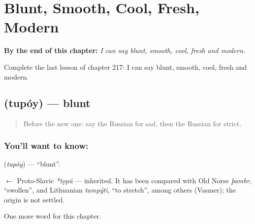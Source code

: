 
\chapter{Blunt, Smooth, Cool, Fresh, Modern}
\label{ch:ru-blunt-smooth-cool-fresh-modern}

\begin{chapteropening}
\textbf{By the end of this chapter:} \emph{I can say blunt, smooth, cool, fresh and modern.}

Complete the last lesson of chapter 217: I can say blunt, smooth, cool, fresh and modern.
\end{chapteropening}

\section[\texorpdfstring{\ru{тупой} (tupóy)}{тупой (tupóy)}]{ (tupóy) — blunt}

\label{lesson:RU-C217-tupoy}



\begin{quote}
Before the new one: say the Russian for sad, then the Russian for strict.
\end{quote}

\subsection*{You'll want to know: }
\textbf{} (\emph{tupóy}) — \textquotedblleft{}blunt\textquotedblright{}.

\begin{cousinweb}
\textbf{} $\leftarrow$ Proto-Slavic \emph{*tǫpŭ} — inherited. It has been compared with Old Norse \emph{þambr}, \textquotedblleft{}swollen\textquotedblright{}, and Lithuanian \emph{tampýti}, \textquotedblleft{}to stretch\textquotedblright{}, among others (Vasmer); the origin is not settled.
\end{cousinweb}

\begin{grammarlens}[title={What you've built}]
One more word for this chapter.
\end{grammarlens}

